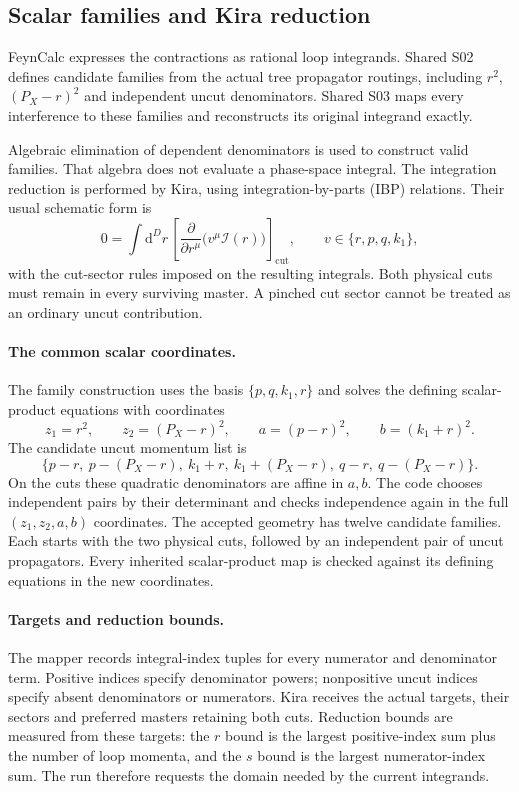 \documentclass[11pt,a4paper]{article}
\newcommand{\dd}{\mathrm{d}}
\newcommand{\cut}{\mathrm{cut}}
\begin{document}
\subsection{Scalar families and Kira reduction}

FeynCalc expresses the contractions as rational loop integrands. Shared
S02 defines candidate families from the actual tree propagator routings,
including $r^2$, $(P_X-r)^2$ and independent uncut denominators.
Shared S03 maps every interference to these families and reconstructs its
original integrand exactly.

Algebraic elimination of dependent denominators is used to construct valid
families. That algebra does not evaluate a phase-space integral. The
integration reduction is performed by Kira, using integration-by-parts
(IBP) relations. Their usual schematic form is
\begin{equation}
 0=\int\dd^D r\,
 \left[\frac{\partial}{\partial r^\mu}
       \bigl(v^\mu\mathcal I(r)\bigr)\right]_{\cut},
 \qquad v\in\{r,p,q,k_1\},
 \label{eq:ibp}
\end{equation}
with the cut-sector rules imposed on the resulting integrals.
Both physical cuts must remain in every surviving master. A pinched cut
sector cannot be treated as an ordinary uncut contribution.

\paragraph{The common scalar coordinates.}
The family construction uses the basis $\{p,q,k_1,r\}$ and solves the
defining scalar-product equations with coordinates
\begin{equation}
 z_1=r^2,\qquad z_2=(P_X-r)^2,\qquad
 a=(p-r)^2,\qquad b=(k_1+r)^2.
 \label{eq:realcoordinates}
\end{equation}
The candidate uncut momentum list is
\begin{equation}
 \{p-r,\ p-(P_X-r),\ k_1+r,\ k_1+(P_X-r),\ q-r,\ q-(P_X-r)\}.
\end{equation}
On the cuts these quadratic denominators are affine in $a,b$. The code
chooses independent pairs by their determinant and checks independence
again in the full $(z_1,z_2,a,b)$ coordinates. The accepted geometry has
twelve candidate families. Each starts with the two physical cuts,
followed by an independent pair of uncut propagators. Every inherited
scalar-product map is checked against its defining equations in the new
coordinates.

\paragraph{Targets and reduction bounds.}
The mapper records integral-index tuples for every numerator and
denominator term. Positive indices specify denominator powers;
nonpositive uncut indices specify absent denominators or numerators.
Kira receives the actual targets, their sectors and preferred masters
retaining both cuts. Reduction bounds are measured from these targets:
the $r$ bound is the largest positive-index sum plus the number of loop
momenta, and the $s$ bound is the largest numerator-index sum. The run
therefore requests the domain needed by the current integrands.
\end{document}
